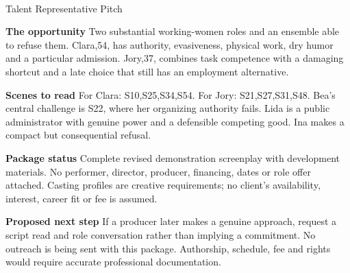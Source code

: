 \documentclass[11pt,letterpaper]{article}
\begin{document}
\begin{center}
{\Large\bfseries\sffamily \filmtitleupper}\\[6pt]
Talent Representative Pitch
\end{center}
\textbf{The opportunity} Two substantial working-women roles and an ensemble able to refuse them. Clara,54, has authority, evasiveness, physical work, dry humor and a particular admission. Jory,37, combines task competence with a damaging shortcut and a late choice that still has an employment alternative.

\textbf{Scenes to read} For Clara: S10,S25,S34,S54. For Jory: S21,S27,S31,S48. Bea's central challenge is S22, where her organizing authority fails. Lida is a public administrator with genuine power and a defensible competing good. Ina makes a compact but consequential refusal.

\textbf{Package status} Complete revised demonstration screenplay with development materials. No performer, director, producer, financing, dates or role offer attached. Casting profiles are creative requirements; no client's availability, interest, career fit or fee is assumed.

\textbf{Proposed next step} If a producer later makes a genuine approach, request a script read and role conversation rather than implying a commitment. No outreach is being sent with this package. Authorship, schedule, fee and rights would require accurate professional documentation.
\end{document}

